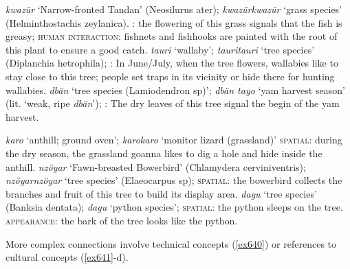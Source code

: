 \begin{exe}
\ex \label{ex631}
	\begin{xlist}
		\ex \label{ex632} \emph{kwazür} `Narrow-fronted Tandan' (Neosilurus ater); \emph{kwazürkwazür} `grass species' (Helminthostachis zeylanica). \textsc{:} the flowering of this grass signals that the fish is greasy; \textsc{human interaction:} fishnets and fishhooks are painted with the root of this plant to ensure a good catch.
		\ex \label{ex633} \emph{tauri} `wallaby'; \emph{tauritauri} `tree species' (Diplanchia hetrophila); \textsc{:} In June/July, when the tree flowers, wallabies like to stay close to this tree; people set traps in its vicinity or hide there for hunting wallabies.
		\ex \label{ex634} \emph{dbän} `tree species (Lamiodendron sp)'; \emph{dbän tayo} `yam harvest season' (lit. `weak, ripe \emph{dbän}'); \textsc{:} The dry leaves of this tree signal the begin of the yam harvest.
	\end{xlist}
\end{exe}%
\begin{exe}
\ex \label{ex635}
	\begin{xlist}
		\ex \label{ex636} \emph{karo} `anthill; ground oven'; \emph{karokaro} `monitor lizard (grassland)' \textsc{spatial:} during the dry season, the grassland goanna likes to dig a hole and hide inside the anthill.
		\ex \label{ex637} \emph{nzöyar} `Fawn-breasted Bowerbird' (Chlamydera cerviniventris); \emph{nzöyarnzöyar} `tree species' (Elaeocarpus sp); \textsc{spatial:} the bowerbird collects the branches and fruit of this tree to build its display area.
		\ex \label{ex638} \emph{dagu} `tree species' (Banksia dentata); \emph{dagu} `python species'; \textsc{spatial:} the python sleeps on the tree. \textsc{appearance:} the bark of the tree looks like the python.
	\end{xlist}
\end{exe}%

More complex connections involve technical concepts (\ref{ex640}) or references to cultural concepts (\ref{ex641}-d).

